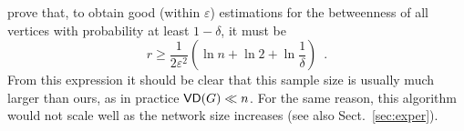 prove that, to obtain good (within $\varepsilon$) estimations for the
betweenness of all vertices with probability at least $1-\delta$, it must be
\[
r\geq \frac{1}{2\varepsilon^2}\left(\ln n + \ln 2 +\ln\frac{1}{\delta}\right)\enspace.
\]
From this expression it should be clear that this sample size is usually much
larger than ours, as in practice $\mathsf{VD}(G)\ll n$. For the same reason, this
algorithm would not scale well as the network size increases (see also
Sect.~\ref{sec:exper}).

